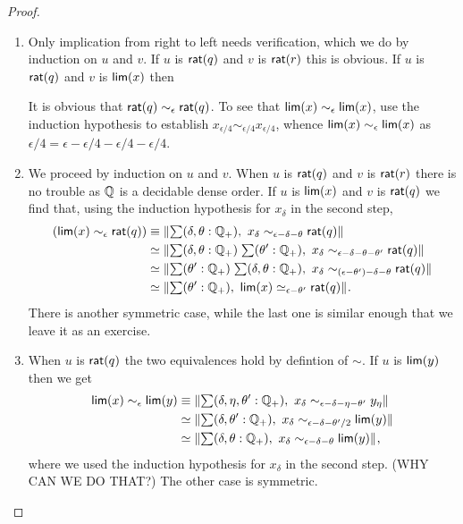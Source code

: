 \begin{proof}
  \mbox{}
  \begin{enumerate}

  \item Only implication from right to left needs verification, which we do by induction
    on $u$ and $v$. If $u$ is $\mathsf{rat}(q)$ and $v$ is $\mathsf{rat}(r)$ this is obvious. If $u$
    is $\mathsf{rat}(q)$ and $v$ is $\mathsf{lim}(x)$ then


 It is obvious that $\mathsf{rat}(q) \sim_\epsilon \mathsf{rat}(q)$. To see that $\mathsf{lim}(x)
    \sim_\epsilon \mathsf{lim}(x)$, use the induction hypothesis to establish $x_{\epsilon/4}
    \sim_{\epsilon/4} x_{\epsilon/4}$, whence $\mathsf{lim}(x) \sim_\epsilon \mathsf{lim}(x)$ as
    $\epsilon/4 = \epsilon - \epsilon/4 - \epsilon/4 - \epsilon/4$.

  \item We proceed by induction on $u$ and $v$. When $u$ is $\mathsf{rat}(q)$ and $v$ is
    $\mathsf{rat}(r)$ there is no trouble as $\mathbb{Q}$ is a decidable dense order. If $u$ is
    $\mathsf{lim}(x)$ and $v$ is $\mathsf{rat}(q)$ we find that, using the induction hypothesis for
    $x_\delta$ in the second step,
    \begin{align*}
      (\rclim(x) \sim_\epsilon \rcrat(q))
      &\jdeq
      \brck{\sm{\delta, \theta : \Qp} x_\delta \sim_{\epsilon - \delta - \theta} \rcrat(q)}
      \\
      &\simeq
      \brck{\sm{\delta, \theta : \Qp}{\theta' : \Qp}
        x_\delta \sim_{\epsilon - \delta - \theta - \theta'} \rcrat(q)}
      \\
      &\simeq
      \brck{\sm{\theta' : \Qp}{\delta, \theta : \Qp}
          x_\delta \sim_{(\epsilon - \theta') - \delta - \theta} \rcrat(q)}
      \\
      &\simeq
      \brck{\sm{\theta' : \Qp} \rclim(x) \simeq_{\epsilon - \theta'} \rcrat(q)}.
    \end{align*}
    There is another symmetric case, while the last one is similar enough that we leave it
    as an exercise.

  \item When $u$ is $\mathsf{rat}(q)$ the two equivalences hold by defintion of $\sim$. If
    $u$ is $\mathsf{lim}(y)$ then we get
    \begin{align*}
      \rclim(x) \sim_\epsilon \rclim(y) &\jdeq
      \brck{\sm{\delta, \eta, \theta' : \Qp}
        x_\delta \sim_{\epsilon - \delta - \eta - \theta'} y_\eta}
      \\
      &\simeq
      \brck{\sm{\delta, \theta' : \Qp}
        x_\delta \sim_{\epsilon - \delta - \theta'/2} \rclim(y)}
      \\
      &\simeq
      \brck{\sm{\delta, \theta : \Qp} x_\delta \sim_{\epsilon - \delta - \theta} \rclim(y)},
    \end{align*}
    where we used the induction hypothesis for $x_\delta$ in the second step. (WHY CAN WE
    DO THAT?) The other case is symmetric.


\end{enumerate}
\end{proof}
